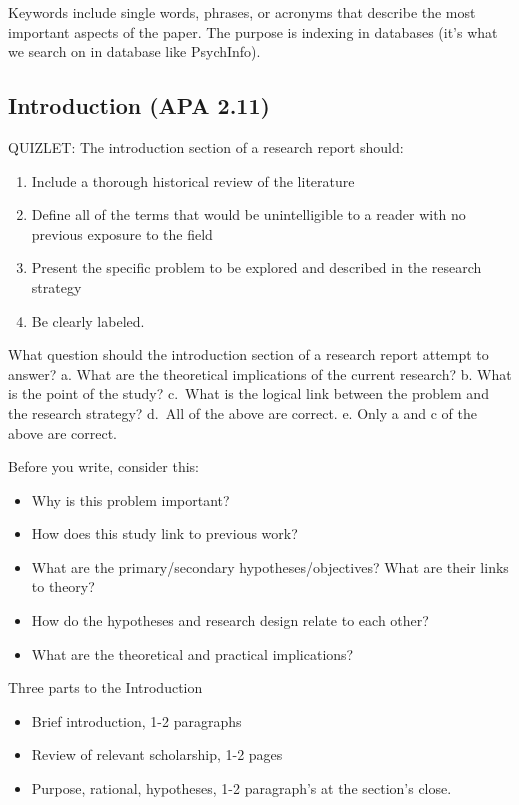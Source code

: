 \documentclass[
  11pt,
]{book}
\providecommand{\tightlist}{%
  \setlength{\itemsep}{0pt}\setlength{\parskip}{0pt}}
\begin{document}
Keywords include single words, phrases, or acronyms that describe the most important aspects of the paper. The purpose is indexing in databases (it's what we search on in database like PsychInfo).

\hypertarget{introduction-apa-2.11}{%
\subsection{Introduction (APA 2.11)}\label{introduction-apa-2.11}}

QUIZLET:
The introduction section of a research report should:

\begin{enumerate}
\def\labelenumi{\alph{enumi}.}
\tightlist
\item
  Include a thorough historical review of the literature
\item
  Define all of the terms that would be unintelligible to a reader with no previous exposure to the field
\item
  Present the specific problem to be explored and described in the research strategy
\item
  Be clearly labeled.
\end{enumerate}

What question should the introduction section of a research report attempt to answer?
a. What are the theoretical implications of the current research?
b. What is the point of the study?
c.~What is the logical link between the problem and the research strategy?
d.~All of the above are correct.
e. Only a and c of the above are correct.

Before you write, consider this:

\begin{itemize}
\tightlist
\item
  Why is this problem important?
\item
  How does this study link to previous work?
\item
  What are the primary/secondary hypotheses/objectives? What are their links to theory?
\item
  How do the hypotheses and research design relate to each other?
\item
  What are the theoretical and practical implications?
\end{itemize}

Three parts to the Introduction

\begin{itemize}
\tightlist
\item
  Brief introduction, 1-2 paragraphs
\item
  Review of relevant scholarship, 1-2 pages
\item
  Purpose, rational, hypotheses, 1-2 paragraph's at the section's close.
\end{itemize}
\end{document}
